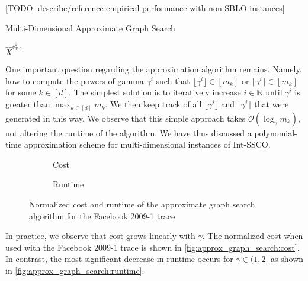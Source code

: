 [TODO: describe/reference empirical performance with non-SBLO instances]

\begin{algorithm}
    \caption{Multi-Dimensional Approximate Graph Search \cite{Albers2021_2}}\label{alg:md:approximate_graph_search}
    \Return $\hat{X}^{v_{T,\mathbf{0}}^{\downarrow}}$\;
\end{algorithm}

One important question regarding the approximation algorithm remains. Namely, how to compute the powers of gamma $\gamma^i$ such that $\lfloor\gamma^i\rfloor \in [m_k]$ or $\lceil\gamma^i\rceil \in [m_k]$ for some $k \in [d]$. The simplest solution is to iteratively increase $i \in \mathbb{N}$ until $\gamma^i$ is greater than $\max_{k \in [d]} m_k$. We then keep track of all $\lfloor\gamma^i\rfloor$ and $\lceil\gamma^i\rceil$ that were generated in this way. We observe that this simple approach takes $\mathcal{O}(\log_{\gamma} m_k)$, not altering the runtime of the algorithm. We have thus discussed a polynomial-time approximation scheme for multi-dimensional instances of Int-SSCO.

\begin{figure}
    \begin{subfigure}[b]{.5\linewidth}
    \resizebox{\textwidth}{!}{}
    \caption{Cost}\label{fig:approx_graph_search:cost}
    \end{subfigure}
    \begin{subfigure}[b]{.5\linewidth}
    \resizebox{\textwidth}{!}{}
    \caption{Runtime}\label{fig:approx_graph_search:runtime}
    \end{subfigure}
    \caption{Normalized cost and runtime of the approximate graph search algorithm for the Facebook 2009-1 trace}
\end{figure}

In practice, we observe that cost grows linearly with $\gamma$. The normalized cost when used with the Facebook 2009-1 trace is shown in \autoref{fig:approx_graph_search:cost}. In contrast, the most significant decrease in runtime occurs for $\gamma \in (1, 2]$ as shown in \autoref{fig:approx_graph_search:runtime}.
